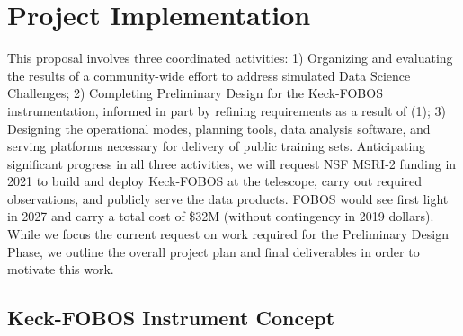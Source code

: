 \documentclass[oneside,11pt]{amsart}
\newcommand{\comment}[2][todo]{{\color{#1}[[{\bf #2}]]}}
\begin{document}






\section{Project Implementation}
\label{sec:project}

This proposal involves three coordinated activities: 1) Organizing and evaluating the results of a community-wide
effort to address simulated Data Science Challenges; 2) Completing Preliminary Design for the Keck-FOBOS
instrumentation, informed in part by refining requirements as a result of (1); 3) Designing the operational modes,
planning tools, data analysis software, and serving platforms necessary for delivery of public training sets.
Anticipating significant progress in all three activities, we will request NSF MSRI-2 funding in 2021 to build and
deploy Keck-FOBOS at the telescope, carry out required observations, and publicly serve the data products.  FOBOS would
see first light in 2027 and carry a total cost of \$32M (without contingency in 2019 dollars).  While we focus the
current request on work required for the Preliminary Design Phase, we outline the overall project plan and final
deliverables in order to motivate this work.

\subsection{Keck-FOBOS Instrument Concept}
\label{sec:concept}

\end{document}
